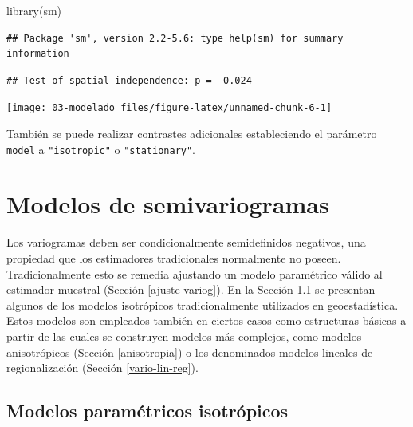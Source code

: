 \documentclass[
  spanish,
]{book}
\newenvironment{Shaded}{\begin{snugshade}}{\end{snugshade}}
\newcommand{\AttributeTok}[1]{\textcolor[rgb]{0.77,0.63,0.00}{#1}}
\newcommand{\FunctionTok}[1]{\textcolor[rgb]{0.00,0.00,0.00}{#1}}
\newcommand{\NormalTok}[1]{#1}
\newcommand{\SpecialCharTok}[1]{\textcolor[rgb]{0.00,0.00,0.00}{#1}}
\newcommand{\StringTok}[1]{\textcolor[rgb]{0.31,0.60,0.02}{#1}}
\theoremstyle{break}
\begin{document}
\begin{Shaded}
\begin{Highlighting}[]
\FunctionTok{library}\NormalTok{(sm)}
\end{Highlighting}
\end{Shaded}

\begin{verbatim}
## Package 'sm', version 2.2-5.6: type help(sm) for summary information
\end{verbatim}

\begin{Shaded}
\end{Shaded}

\begin{verbatim}
## Test of spatial independence: p =  0.024
\end{verbatim}

\begin{center}\texttt{[image: 03-modelado\_files/figure-latex/unnamed-chunk-6-1]} \end{center}

También se puede realizar contrastes adicionales estableciendo el parámetro \texttt{model} a \texttt{"isotropic"} o \texttt{"stationary"}.

\hypertarget{modelos-variog}{%
\section{Modelos de semivariogramas}\label{modelos-variog}}

Los variogramas deben ser condicionalmente semidefinidos negativos, una propiedad que los estimadores tradicionales normalmente no poseen.
Tradicionalmente esto se remedia ajustando un modelo paramétrico válido al estimador muestral (Sección \ref{ajuste-variog}).
En la Sección \ref{modelos-parametricos} se presentan algunos de los modelos isotrópicos tradicionalmente utilizados en geoestadística.
Estos modelos son empleados también en ciertos casos como estructuras básicas a partir de las cuales se construyen modelos más complejos, como modelos anisotrópicos (Sección \ref{anisotropia}) o los denominados modelos lineales de regionalización (Sección \ref{vario-lin-reg}).

\hypertarget{modelos-parametricos}{%
\subsection{Modelos paramétricos isotrópicos}\label{modelos-parametricos}}
\end{document}
